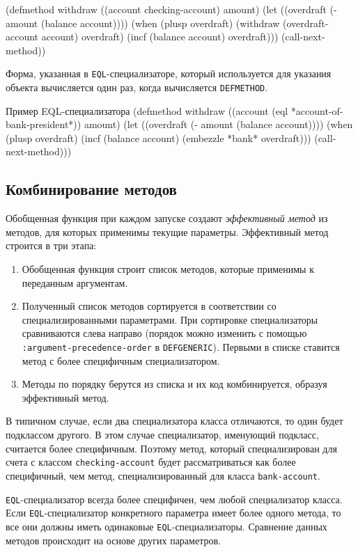 \begin{cllst}{}{}
(defmethod withdraw ((account checking-account) amount)
  (let ((overdraft (- amount (balance account))))
    (when (plusp overdraft)
      (withdraw (overdraft-account account) overdraft)
      (incf (balance account) overdraft)))
  (call-next-method))
\end{cllst}

Форма, указанная в \lstinline{EQL}-специализаторе, который используется для указания объекта вычисляется один раз, когда вычисляется \lstinline{DEFMETHOD}.
\begin{cllst}{Пример EQL-специализатора}{}
(defmethod withdraw ((account (eql *account-of-bank-president*)) amount)
  (let ((overdraft (- amount (balance account))))
    (when (plusp overdraft)
      (incf (balance account) (embezzle *bank* overdraft)))
  (call-next-method)))
\end{cllst}

\subsection{Комбинирование методов}
Обобщенная функция при каждом запуске создают \emph{эффективный метод} из методов, для которых применимы текущие параметры. Эффективный метод строится в три этапа:
\begin{enumerate}
  \item Обобщенная функция строит список методов, которые применимы к переданным аргументам.
  \item Полученный список методов сортируется в соответствии со специализированными параметрами. При сортировке специализаторы сравниваются слева направо (порядок можно изменить с помощью \lstinline{:argument-precedence-order} в \lstinline{DEFGENERIC}). Первыми в списке  ставится метод с более специфичным специализатором.
  \item Методы по порядку берутся из списка и их код комбинируется, образуя эффективный метод.
\end{enumerate}

В типичном случае, если два специализатора класса отличаются, то один будет подклассом другого. В этом случае специализатор, именующий подкласс, считается более специфичным. Поэтому метод, который специализирован для счета с классом \lstinline{checking-account} будет рассматриваться как более специфичный, чем метод, специализированный для класса \lstinline{bank-account}.

\lstinline{EQL}-специализатор всегда более специфичен, чем любой специализатор класса. Если \lstinline{EQL}-специализатор конкретного параметра имеет более одного метода, то все они должны иметь одинаковые \lstinline{EQL}-специализаторы. Сравнение данных методов происходит на основе других параметров.


